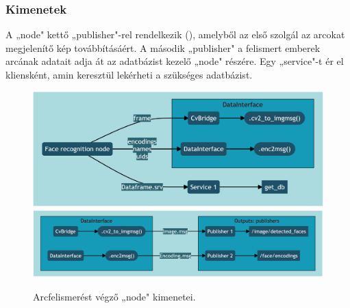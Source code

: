 \subsubsection{Kimenetek}
A „node" kettő „publisher"-rel rendelkezik (), amelyből az első szolgál az arcokat megjelenítő kép továbbításáért. A második „publisher" a felismert emberek arcának adatait adja át az adatbázist kezelő „node" részére. Egy „service"-t ér el kliensként, amin keresztül lekérheti a szükséges adatbázist. 
\begin{figure}[!ht]
    \centering
    \includegraphics[width=150mm, keepaspectratio]{02_mermaid/fr_kimenet1.png}
    \includegraphics[width=150mm, keepaspectratio]{02_mermaid/fr_kimenet2.png}
    \caption{Arcfelismerést végző „node" kimenetei.}
    \label{fig:fro}
\end{figure}

